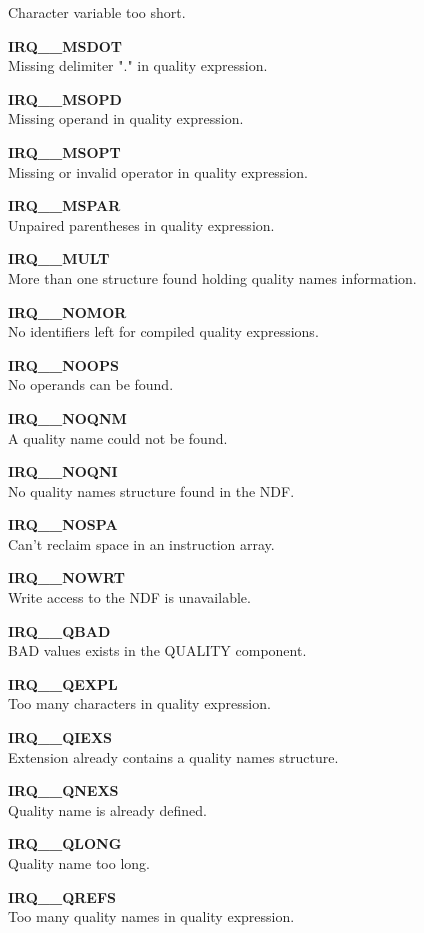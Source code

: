 \documentclass[twoside,11pt,nolof]{starlink}
\begin{document}
\begin{description}
Character variable too short.
\item \textbf{IRQ\_\_MSDOT}\\
Missing delimiter "." in quality expression.
\item \textbf{IRQ\_\_MSOPD}\\
Missing operand in quality expression.
\item \textbf{IRQ\_\_MSOPT}\\
Missing or invalid operator in quality expression.
\item \textbf{IRQ\_\_MSPAR}\\
Unpaired parentheses in quality expression.
\item \textbf{IRQ\_\_MULT }\\
More than one structure found holding quality names information.
\item \textbf{IRQ\_\_NOMOR}\\
No identifiers left for compiled quality expressions.
\item \textbf{IRQ\_\_NOOPS}\\
No operands can be found.
\item \textbf{IRQ\_\_NOQNM}\\
A quality name could not be found.
\item \textbf{IRQ\_\_NOQNI}\\
No quality names structure found in the NDF.
\item \textbf{IRQ\_\_NOSPA}\\
Can't reclaim space in an instruction array.
\item \textbf{IRQ\_\_NOWRT}\\
Write access to the NDF is unavailable.
\item \textbf{IRQ\_\_QBAD }\\
BAD values exists in the QUALITY component.
\item \textbf{IRQ\_\_QEXPL}\\
Too many characters in quality expression.
\item \textbf{IRQ\_\_QIEXS}\\
Extension already contains a quality names structure.
\item \textbf{IRQ\_\_QNEXS}\\
Quality name is already defined.
\item \textbf{IRQ\_\_QLONG}\\
Quality name too long.
\item \textbf{IRQ\_\_QREFS}\\
Too many quality names in quality expression.

\end{description}
\end{document}
